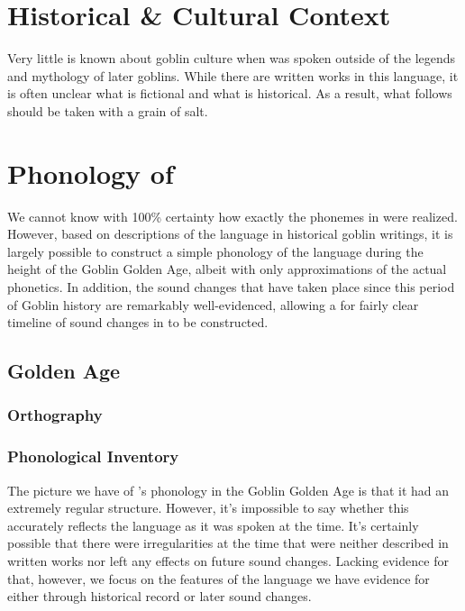 \chapter[Historical \& Cultural Context][Historical \& Cultural Context of \oldlang{}]{Historical \& Cultural Context}

Very little is known about goblin culture when \oldlang{} was spoken outside of the legends and mythology of later goblins. While there are written works in this language, it is often unclear what is fictional and what is historical. As a result, what follows should be taken with a grain of salt.



\chapter[Phonology][Phonology of \oldlang{}]{Phonology of \oldlang{}}

We cannot know with 100\% certainty how exactly the phonemes in \oldlang{} were realized. However, based on descriptions of the language in historical goblin writings, it is largely possible to construct a simple phonology of the language during the height of the Goblin Golden Age, albeit with only approximations of the actual phonetics. In addition, the sound changes that have taken place since this period of Goblin history are remarkably well-evidenced, allowing a for fairly clear timeline of sound changes in \oldlang{} to be constructed.

\section{Golden Age \oldlang{}}

\subsection{Orthography}


\subsection{Phonological Inventory}

The picture we have of \oldlang{}'s phonology in the Goblin Golden Age is that it had an extremely regular structure. However, it's impossible to say whether this accurately reflects the language as it was spoken at the time. It's certainly possible that there were irregularities at the time that were neither described in written works nor left any effects on future sound changes. Lacking evidence for that, however, we focus on the features of the language we have evidence for either through historical record or later sound changes.

